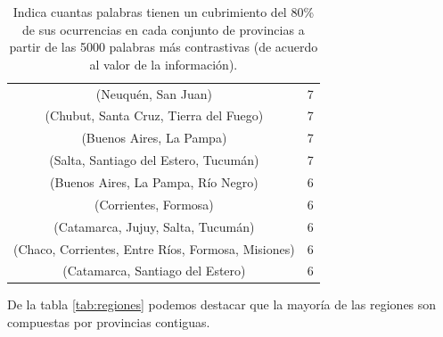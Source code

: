 \begin{table}[]
\begin{tabular}{|c|c|}
(Neuquén, San Juan)                                    & 7           \\ %
(Chubut, Santa Cruz, Tierra del Fuego)                 & 7           \\
(Buenos Aires, La Pampa)                                & 7           \\
(Salta, Santiago del Estero, Tucumán)                  & 7           \\
(Buenos Aires, La Pampa, Río Negro)                     & 6           \\
(Corrientes, Formosa)                                  & 6           \\
(Catamarca, Jujuy, Salta, Tucumán)                     & 6           \\
(Chaco, Corrientes, Entre Ríos, Formosa, Misiones)     & 6           \\
(Catamarca, Santiago del Estero)                       & 6           \\
\hline
\end{tabular}
\caption{Indica cuantas palabras tienen un cubrimiento del 80\% de sus ocurrencias en cada conjunto de provincias a partir de las 5000 palabras más contrastivas (de acuerdo al valor de la información).}
\end{table}

De la tabla \ref{tab:regiones} podemos destacar que la mayoría de las regiones son compuestas por provincias contiguas.


